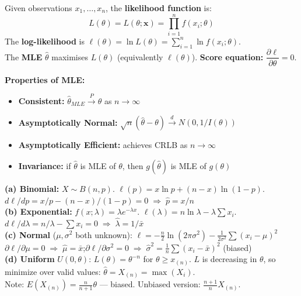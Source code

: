 \documentclass[12pt]{article}
\begin{document}
\begin{defbox}
Given observations $x_1,\ldots,x_n$, the \textbf{likelihood function} is:
\[L(\theta)=L(\theta;\mathbf x)=\prod_{i=1}^n f(x_i;\theta)\]
The \textbf{log-likelihood} is $\ell(\theta)=\ln L(\theta)=\sum_{i=1}^n\ln f(x_i;\theta)$.\\[6pt]
The \textbf{MLE} $\hat\theta$ maximises $L(\theta)$ (equivalently $\ell(\theta)$). \textbf{Score equation:} $\dfrac{\partial\ell}{\partial\theta}=0$.
\end{defbox}

\begin{keybox}
\textbf{Properties of MLE:}
\begin{itemize}[noitemsep]
  \item \textbf{Consistent:} $\hat\theta_{MLE}\xrightarrow{P}\theta$ as $n\to\infty$
  \item \textbf{Asymptotically Normal:} $\sqrt{n}(\hat\theta-\theta)\xrightarrow{d}N(0,1/I(\theta))$
  \item \textbf{Asymptotically Efficient:} achieves CRLB as $n\to\infty$
  \item \textbf{Invariance:} if $\hat\theta$ is MLE of $\theta$, then $g(\hat\theta)$ is MLE of $g(\theta)$
\end{itemize}
\end{keybox}

\begin{examplebox}
\textbf{(a) Binomial:} $X\sim B(n,p)$. $\ell(p)=x\ln p+(n-x)\ln(1-p)$.\\
$d\ell/dp=x/p-(n-x)/(1-p)=0\;\Rightarrow\;\boxed{\hat p=x/n}$\\[6pt]
\textbf{(b) Exponential:} $f(x;\lambda)=\lambda e^{-\lambda x}$. $\ell(\lambda)=n\ln\lambda-\lambda\sum x_i$.\\
$d\ell/d\lambda=n/\lambda-\sum x_i=0\;\Rightarrow\;\boxed{\hat\lambda=1/\bar x}$\\[6pt]
\textbf{(c) Normal} ($\mu,\sigma^2$ both unknown):
$\ell=-\frac{n}{2}\ln(2\pi\sigma^2)-\frac{1}{2\sigma^2}\sum(x_i-\mu)^2$\\
$\partial\ell/\partial\mu=0\;\Rightarrow\;\hat\mu=\bar x$;\quad $\partial\ell/\partial\sigma^2=0\;\Rightarrow\;\hat\sigma^2=\frac{1}{n}\sum(x_i-\bar x)^2$ (biased)\\[6pt]
\textbf{(d) Uniform} $U(0,\theta)$: $L(\theta)=\theta^{-n}$ for $\theta\geq x_{(n)}$. $L$ is decreasing in $\theta$, so minimize over valid values: $\boxed{\hat\theta=X_{(n)}=\max(X_i)}$.\\
Note: $E(X_{(n)})=\frac{n}{n+1}\theta$ --- biased. Unbiased version: $\frac{n+1}{n}X_{(n)}$.
\end{examplebox}
\end{document}
